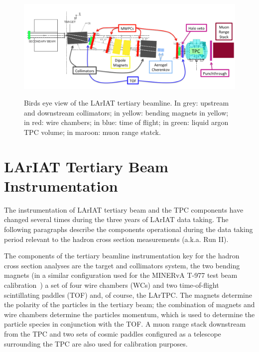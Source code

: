 \begin{figure}
  \centering  	
\includegraphics[width=\textwidth,height=\textheight,keepaspectratio]{Chapter-3/Images/Tertiary.png}
\label{fig:tert-layout}
\caption{Birds eye view of the LArIAT tertiary beamline. In grey: upstream and downstream collimators; in yellow: bending magnets in yellow; in red: wire chambers; in blue: time of flight; in green: liquid argon TPC volume; in maroon: muon range statck.}
\end{figure}


\section{LArIAT Tertiary Beam Instrumentation}\label{sec:Instrumentation}

The instrumentation of  LArIAT tertiary beam and the TPC components have changed several times during the three years of LArIAT data taking. The following paragraphs describe the components operational during the data taking period relevant to the hadron cross section measurements (a.k.a. Run II).

The components of the tertiary beamline instrumentation key for the hadron cross section analyses are the target and collimators system, the two bending magnets (in a similar configuration used for the  MINERvA T-977 test beam calibration~\cite{MinervaTestbeam}) a set of four wire chambers (WCs) and two time-of-flight scintillating paddles (TOF) and, of course, the LArTPC.  The magnets determine the polarity of the particles in the tertiary beam; the combination of magnets and wire chambers determine the particles momentum, which is used to determine the particle species in conjunction with the TOF.
A muon range stack downstream from the TPC and two sets of cosmic paddles configured as a telescope surrounding the TPC are also used for calibration purposes.


